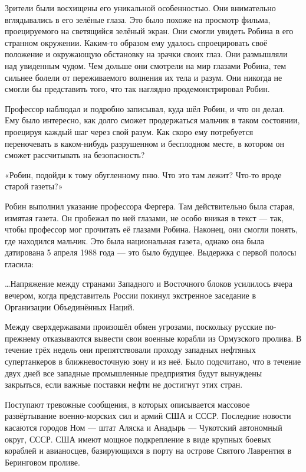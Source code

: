 \documentclass[a5paper, 9pt,
final, openany, twoside=true]{memoir}
\begin{document}
Зрители были восхищены его уникальной особенностью. Они внимательно вглядывались в его зелёные глаза. Это было похоже на просмотр фильма, проецируемого на светящийся зелёный экран. Они смогли увидеть Робина в его странном окружении. Каким-то образом ему удалось спроецировать своё положение и окружающую обстановку на зрачки своих глаз. Они размышляли над увиденным чудом. Чем дольше они смотрели на мир глазами Робина, тем сильнее болели от переживаемого волнения их тела и разум. Они никогда не смогли бы представить того, что так наглядно продемонстрировал Робин.\bigskip

Профессор наблюдал и подробно записывал, куда шёл Робин, и что он делал. Ему было интересно, как долго сможет продержаться мальчик в таком состоянии, проецируя каждый шаг через свой разум. Как скоро ему потребуется переночевать в каком-нибудь разрушенном и бесплодном месте, в котором он сможет рассчитывать на безопасность?

«Робин, подойди к тому обугленному пню. Что это там лежит? Что-то вроде старой газеты?»

Робин выполнил указание профессора Фергера. Там действительно была старая, измятая газета. Он пробежал по ней глазами, не особо вникая в текст — так, чтобы профессор мог прочитать её глазами Робина. Наконец, они смогли понять, где находился мальчик. Это была национальная газета, однако она была датирована 5 апреля 1988 года — это было будущее. Выдержка с первой полосы гласила:\bigskip

…Напряжение между странами Западного и Восточного блоков усилилось вчера вечером, когда представитель России покинул экстренное заседание в Организации Объединённых Наций.

Между сверхдержавами произошёл обмен угрозами, поскольку русские по-прежнему отказываются вывести свои военные корабли из Ормузского пролива. В течение трёх недель они препятствовали проходу западных нефтяных супертанкеров в ближневосточную зону и из неё. Было подсчитано, что в течение двух дней все западные промышленные предприятия будут вынуждены закрыться, если важные поставки нефти не достигнут этих стран.

Поступают тревожные сообщения, в которых описывается массовое развёртывание военно-морских сил и армий США и СССР. Последние новости касаются городов Ном — штат Аляска и Анадырь — Чукотский автономный округ, СССР. США имеют мощное подкрепление в виде крупных боевых кораблей и авианосцев, базирующихся в порту на острове Святого Лаврентия в Беринговом проливе.\bigskip
\end{document}
